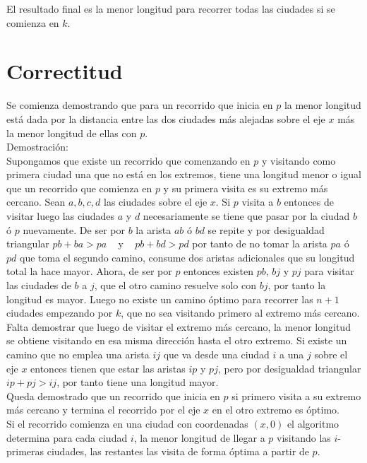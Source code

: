 \documentclass[runningheads,a4paper]{llncs}
\begin{document}
{\begin{itemize}
El resultado final es la menor longitud para recorrer todas las ciudades si se comienza en $k$.
\end{itemize}


\newpage
\section{Correctitud}

Se comienza demostrando que para un recorrido que inicia en $p$ la menor longitud est\'a dada por la distancia entre las dos ciudades m\'as alejadas sobre el eje $x$ m\'as la menor longitud de ellas con $p$.\\

Demostraci\'on:\\
Supongamos que existe un recorrido que comenzando en $p$ y visitando como primera ciudad una que no est\'a en los extremos, tiene una longitud menor o igual que un recorrido que comienza en $p$ y su primera visita es su extremo m\'as cercano. Sean $a, b, c, d$ las ciudades sobre el eje $x$. Si $p$ visita a $b$ entonces de visitar luego las ciudades $a$ y $d$ necesariamente se tiene que pasar por la ciudad $b$ \'o $p$ nuevamente. De ser por $b$ la arista $ab$ \'o $bd$ se repite y por desigualdad triangular $pb + ba > pa$ \,\,\, y \,\,\, $pb + bd > pd$ por tanto de no tomar la arista $pa$ \'o $pd$ que toma el segundo camino, consume dos aristas adicionales que su longitud total la hace mayor. Ahora, de ser por $p$ entonces existen $pb$, $bj$ y $pj$ para visitar las ciudades de $b$ a $j$, que el otro camino resuelve solo con $bj$, por tanto la longitud es mayor. Luego no existe un camino \'optimo para recorrer las $n+1$ ciudades empezando por $k$, que no sea visitando primero al extremo m\'as cercano.\\

Falta demostrar que luego de visitar el extremo m\'as cercano, la menor longitud se obtiene visitando en esa misma direcci\'on hasta el otro extremo. Si existe un camino que no emplea una arista $ij$ que va desde una ciudad $i$ a una $j$ sobre el eje $x$ entonces tienen que estar las aristas $ip$ y $pj$, pero por desigualdad triangular $ip + pj > ij$, por tanto tiene una longitud mayor.\\
 Queda demostrado que un recorrido que inicia en $p$ si primero visita a su extremo m\'as cercano y termina el recorrido por el eje $x$ en el otro extremo es \'optimo.\\

Si el recorrido comienza en una ciudad con coordenadas $(x,0)$ el algoritmo determina para cada ciudad $i$, la menor longitud de llegar a $p$ visitando las $i$- primeras ciudades, las restantes las visita de forma \'optima a partir de $p$.\\
 
}
\end{document}
